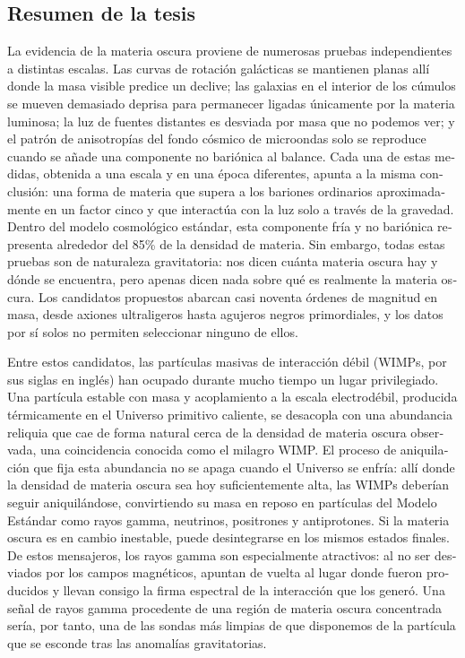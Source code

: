 \begin{otherlanguage}{spanish}
\chapter*{Resumen de la tesis}

La evidencia de la materia oscura proviene de numerosas pruebas independientes a distintas escalas. Las curvas de rotación galácticas se mantienen planas allí donde la masa visible predice un declive; las galaxias en el interior de los cúmulos se mueven demasiado deprisa para permanecer ligadas únicamente por la materia luminosa; la luz de fuentes distantes es desviada por masa que no podemos ver; y el patrón de anisotropías del fondo cósmico de microondas solo se reproduce cuando se añade una componente no bariónica al balance. Cada una de estas medidas, obtenida a una escala y en una época diferentes, apunta a la misma conclusión: una forma de materia que supera a los bariones ordinarios aproximadamente en un factor cinco y que interactúa con la luz solo a través de la gravedad. Dentro del modelo cosmológico estándar, esta componente fría y no bariónica representa alrededor del 85\% de la densidad de materia. Sin embargo, todas estas pruebas son de naturaleza gravitatoria: nos dicen cuánta materia oscura hay y dónde se encuentra, pero apenas dicen nada sobre qué es realmente la materia oscura. Los candidatos propuestos abarcan casi noventa órdenes de magnitud en masa, desde axiones ultraligeros hasta agujeros negros primordiales, y los datos por sí solos no permiten seleccionar ninguno de ellos.

Entre estos candidatos, las partículas masivas de interacción débil (WIMPs, por sus siglas en inglés) han ocupado durante mucho tiempo un lugar privilegiado. Una partícula estable con masa y acoplamiento a la escala electrodébil, producida térmicamente en el Universo primitivo caliente, se desacopla con una abundancia reliquia que cae de forma natural cerca de la densidad de materia oscura observada, una coincidencia conocida como el milagro WIMP. El proceso de aniquilación que fija esta abundancia no se apaga cuando el Universo se enfría: allí donde la densidad de materia oscura sea hoy suficientemente alta, las WIMPs deberían seguir aniquilándose, convirtiendo su masa en reposo en partículas del Modelo Estándar como rayos gamma, neutrinos, positrones y antiprotones. Si la materia oscura es en cambio inestable, puede desintegrarse en los mismos estados finales. De estos mensajeros, los rayos gamma son especialmente atractivos: al no ser desviados por los campos magnéticos, apuntan de vuelta al lugar donde fueron producidos y llevan consigo la firma espectral de la interacción que los generó. Una señal de rayos gamma procedente de una región de materia oscura concentrada sería, por tanto, una de las sondas más limpias de que disponemos de la partícula que se esconde tras las anomalías gravitatorias.


\end{otherlanguage}
